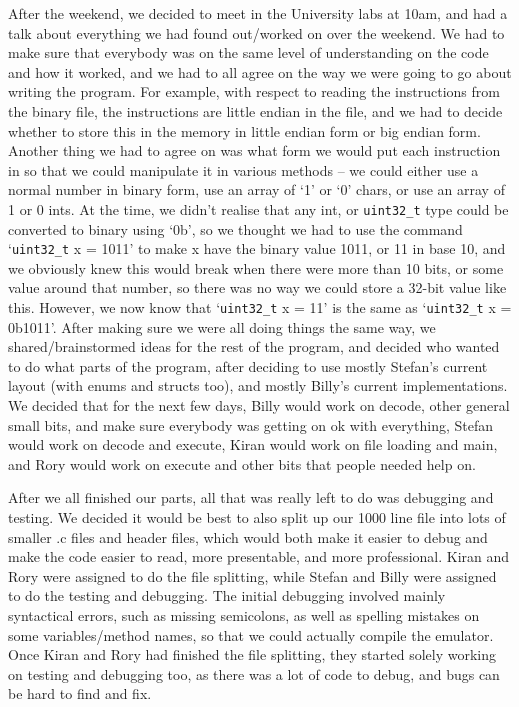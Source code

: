 \documentclass[a4wide, 10pt]{article}
\begin{document}
After the weekend, we decided to meet in the University labs at 10am, and had a talk
 about everything we had found out/worked on over the weekend. We had to make sure that
  everybody was on the same level of understanding on the code and how it worked, and
   we had to all agree on the way we were going to go about writing the program. For
    example, with respect to reading the instructions from the binary file, the
     instructions are little endian in the file, and we had to decide whether to store
      this in the memory in little endian form or big endian form. Another thing we had
       to agree on was what form we would put each instruction in so that we could
        manipulate it in various methods – we could either use a normal number in
         binary form, use an array of ‘1’ or ‘0’ chars, or use an array of 1 or 0 ints.
          At the time, we didn’t realise that any int, or \texttt{uint32\_t} type could be
           converted to binary using ‘0b’, so we thought we had to use the command
            ‘\texttt{uint32\_t} x = 1011’ to make x have the binary value 1011, or 11 in base 10,
             and we obviously knew this would break when there were more than 10 bits,
              or some value around that number, so there was no way we could store a
               32-bit value like this. However, we now know that ‘\texttt{uint32\_t} x = 11’ is
                the same as ‘\texttt{uint32\_t} x = 0b1011’. After making sure we were all doing
                 things the same way, we shared/brainstormed ideas for the rest of the
                  program, and decided who wanted to do what parts of the program,
                   after deciding to use mostly Stefan’s current layout (with enums and
                    structs too), and mostly Billy’s current implementations. We
                     decided that for the next few days, Billy would work on decode,
                      other general small bits, and make sure everybody was getting on
                       ok with everything, Stefan would work on decode and execute,
                        Kiran would work on file loading and main, and Rory would work
                         on execute and other bits that people needed help on.

After we all finished our parts, all that was really left to do was debugging and
 testing. We decided it would be best to also split up our 1000 line file into lots of
  smaller .c files and header files, which would both make it easier to debug and make
   the code easier to read, more presentable, and more professional. Kiran and Rory
    were assigned to do the file splitting, while Stefan and Billy were assigned to do
     the testing and debugging. The initial debugging involved mainly syntactical
      errors, such as missing semicolons, as well as spelling mistakes on some
       variables/method names, so that we could actually compile the emulator. Once
        Kiran and Rory had finished the file splitting, they started solely working on
         testing and debugging too, as there was a lot of code to debug, and bugs can
          be hard to find and fix.
\end{document}
